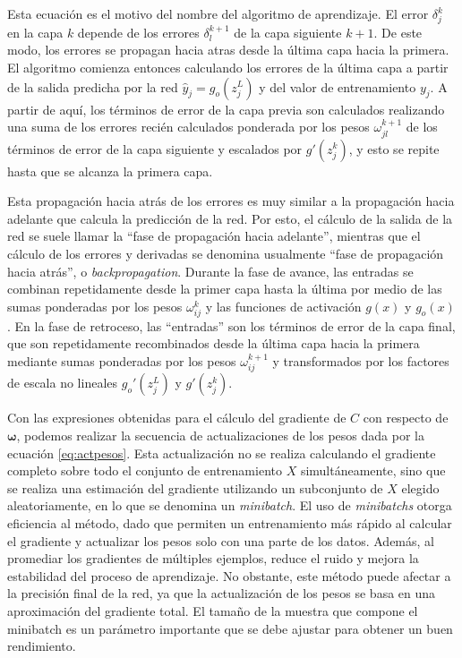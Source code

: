 Esta ecuación es el motivo del nombre del algoritmo de aprendizaje. El error $\delta_j^k$ en la capa $k$ depende de los errores $\delta_l^{k+1}$ de la capa siguiente $k+1$. De este modo, los errores se propagan hacia atras desde la última capa hacia la primera. El algoritmo comienza entonces calculando los errores de la última capa a partir de la salida predicha por la red $\hat{y}_j = g_o(z_j^L)$ y del valor de entrenamiento $y_j$. A partir de aquí, los términos de error de la capa previa son calculados realizando una suma de los errores recién calculados ponderada por los pesos $\omega_{jl}^{k+1}$ de los términos de error de la capa siguiente y escalados por $g'(z_j^k)$, y esto se repite hasta que se alcanza la primera capa.

Esta propagación hacia atrás de los errores es muy similar a la propagación hacia adelante que calcula la predicción de la red. Por esto, el cálculo de la salida de la red se suele llamar la ``fase de propagación hacia adelante'', mientras que el cálculo de los errores y derivadas se denomina usualmente ``fase de propagación hacia atrás'', o \textit{backpropagation}. Durante la fase de avance, las entradas se combinan repetidamente desde la primer capa hasta la última por medio de las sumas ponderadas por los pesos $\omega_{ij}^k$ y las funciones de activación $g(x)$ y $g_o(x)$. En la fase de retroceso, las ``entradas'' son los términos de error de la capa final, que son repetidamente recombinados desde la última capa hacia la primera mediante sumas ponderadas por los pesos $\omega_{ij}^{k+1}$ y transformados por los factores de escala no lineales $g_o'(z_j^L)$ y $g'(z_j^k)$.

Con las expresiones obtenidas para el cálculo del gradiente de $C$ con respecto de $\bm{\omega}$, podemos realizar la secuencia de actualizaciones de los pesos dada por la ecuación \eqref{eq:actpesos}. Esta actualización no se realiza calculando el gradiente completo sobre todo el conjunto de entrenamiento $X$ simultáneamente, sino que se realiza una estimación del gradiente utilizando un subconjunto de $X$ elegido aleatoriamente, en lo que se denomina un \textit{minibatch}. El uso de \textit{minibatchs} otorga eficiencia al método, dado que permiten un entrenamiento más rápido al calcular el gradiente y actualizar los pesos solo con una parte de los datos. Además, al promediar los gradientes de múltiples ejemplos, reduce el ruido y mejora la estabilidad del proceso de aprendizaje. No obstante, este método puede afectar a la precisión final de la red, ya que la actualización de los pesos se basa en una aproximación del gradiente total. El tamaño de la muestra que compone el minibatch es un parámetro importante que se debe ajustar para obtener un buen rendimiento.

